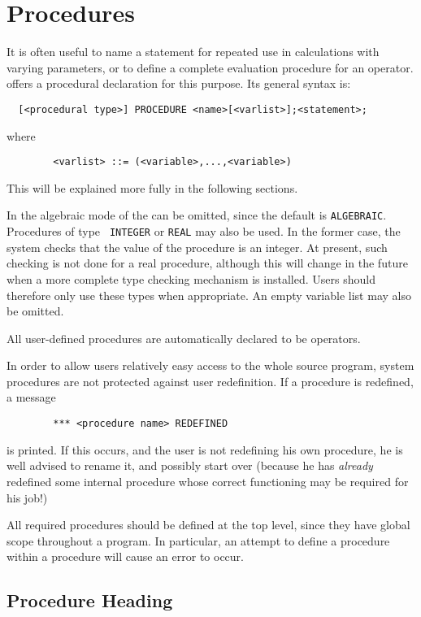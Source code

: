 \chapter{Procedures}

It is often useful to name a statement for repeated use in calculations
with varying parameters, or to define a complete evaluation procedure for
an operator. {\REDUCE} offers a procedural declaration for this purpose. Its
general syntax is:
\begin{verbatim}
  [<procedural type>] PROCEDURE <name>[<varlist>];<statement>;
\end{verbatim}
where
\begin{verbatim}
        <varlist> ::= (<variable>,...,<variable>)
\end{verbatim}
This will be explained more fully in the following sections.

In the algebraic mode of {\REDUCE} the {\tt <procedure type>} can be
omitted, since the default is {\tt ALGEBRAIC}.  Procedures of type {\tt
INTEGER} or {\tt REAL} may also be used.  In the former case, the system
checks that the value of the procedure is an integer.  At present, such
checking is not done for a real procedure, although this will change in
the future when a more complete type checking mechanism is installed.
Users should therefore only use these types when appropriate.  An empty
variable list may also be omitted.

All user-defined procedures are automatically declared to be operators.

In order to allow users relatively easy access to the whole {\REDUCE} source
program, system procedures are not protected against user redefinition. If
a procedure is redefined, a message
\begin{verbatim}
        *** <procedure name> REDEFINED
\end{verbatim}
is printed. If this occurs, and the user is not redefining his own
procedure, he is well advised to rename it, and possibly start over
(because he has {\em already\/} redefined some internal procedure whose correct
functioning may be required for his job!)

All required procedures should be defined at the top level, since they
have global scope throughout a program. In particular, an attempt to
define a procedure within a procedure will cause an error to occur.

\section{Procedure Heading}

